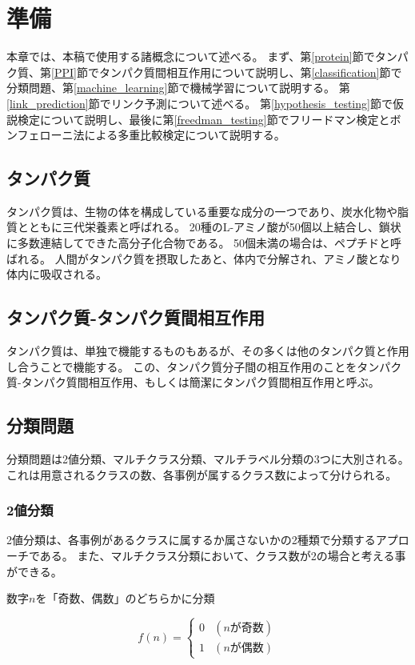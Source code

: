 \documentclass[titlepage,12pt]{jreport}
\def\ex{\noindent{{\bf 例}：}}
\begin{document}
\chapter{準備\label{ready}}
本章では、本稿で使用する諸概念について述べる。 まず、第\ref{protein}節でタンパク質、第\ref{PPI}節でタンパク質間相互作用について説明し、第\ref{classification}節で分類問題、第\ref{machine_learning}節で機械学習について説明する。 第\ref{link_prediction}節でリンク予測について述べる。 第\ref{hypothesis_testing}節で仮説検定について説明し、最後に第\ref{freedman_testing}節でフリードマン検定とボンフェローニ法による多重比較検定について説明する。
\section{タンパク質\label{protein}}
タンパク質は、生物の体を構成している重要な成分の一つであり、炭水化物や脂質とともに三代栄養素と呼ばれる。 20種のL-アミノ酸が50個以上結合し、鎖状に多数連結してできた高分子化合物である。 50個未満の場合は、ペプチドと呼ばれる。 人間がタンパク質を摂取したあと、体内で分解され、アミノ酸となり体内に吸収される。 
\section{タンパク質-タンパク質間相互作用\label{PPI}}
タンパク質は、単独で機能するものもあるが、その多くは他のタンパク質と作用し合うことで機能する。 この、タンパク質分子間の相互作用のことをタンパク質-タンパク質間相互作用、もしくは簡潔にタンパク質間相互作用と呼ぶ。
\section{分類問題\label{classification}}
分類問題は2値分類、マルチクラス分類、マルチラベル分類の3つに大別される。 これは用意されるクラスの数、各事例が属するクラス数によって分けられる。
\subsection{2値分類}
2値分類は、各事例があるクラスに属するか属さないかの2種類で分類するアプローチである。 また、マルチクラス分類において、クラス数が2の場合と考える事ができる。
\begin{description}
\item \ex 数字$n$を「奇数、偶数」のどちらかに分類
\end{description}
\begin{equation}
f(n) = \left\{ \begin{array}{ll}
	0 & (nが奇数)\\
	1 & (nが偶数)
	\end{array}\right.
\end{equation}
\end{document}
